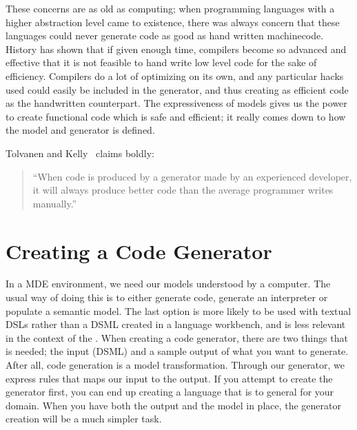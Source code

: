 These concerns are as old as computing; when programming languages with a higher abstraction level came to existence, there was always concern that these languages could never generate code as good as hand written machinecode. History has shown that if given enough time, compilers become so advanced and effective that it is not feasible to hand write low level code for the sake of efficiency. Compilers do a lot of optimizing on its own, and any particular hacks used could easily be included in the generator, and thus creating as efficient code as the handwritten counterpart. The expressiveness of models gives us the power to create functional code which is safe and efficient; it really comes down to how the model and generator is defined. 

Tolvanen and Kelly~\cite{tolvanen:dsm} claims boldly:
\begin{quote}
``When code is produced by a generator made by an experienced developer, it will always produce better code than the average programmer writes manually.'' 
\end{quote}

\section{Creating a Code Generator}\label{sec:create_generator}
In a MDE environment, we need our models understood by a computer. The usual way of doing this is to either generate code, generate an interpreter or populate a semantic model. The last option is more likely to be used with textual DSLs rather than a DSML created in a language workbench, and is less relevant in the context of the \pluginName.
When creating a code generator, there are two things that is needed; the input (DSML) and a sample output of what you want to generate. After all, code generation is a model transformation. Through our generator, we express rules that maps our input to the output. If you attempt to create the generator first, you can end up creating a language that is to general for your domain. When you have both the output and the model in place, the generator creation will be a much simpler task. 

